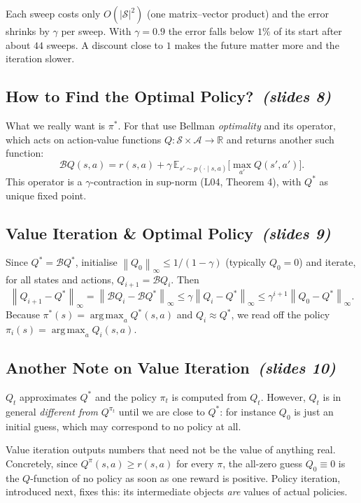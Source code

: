 \documentclass[11pt,a4paper]{article}
\newcommand{\E}{\mathbb{E}}
\newcommand{\R}{\mathbb{R}}
\newcommand{\Sset}{\mathcal{S}}
\newcommand{\Aset}{\mathcal{A}}
\newcommand{\B}{\mathcal{B}}
\newcommand{\norm}[1]{\left\lVert #1\right\rVert_\infty}
\DeclareMathOperator*{\argmax}{arg\,max}
\newcommand{\sltag}[1]{\texorpdfstring{\ \emph{(slides #1)}}{ (slides #1)}}
\theoremstyle{plain}
\theoremstyle{definition}
\theoremstyle{remark}
\begin{document}
\begin{intuition}
Each sweep costs only $O(|\Sset|^2)$ (one matrix--vector product) and the error shrinks by $\gamma$ per sweep. With $\gamma=0.9$ the error falls below $1\%$ of its start after about $44$ sweeps. A discount close to $1$ makes the future matter more and the iteration slower.
\end{intuition}

\subsection{How to Find the Optimal Policy?\sltag{8}}
What we really want is $\pi^*$. For that use Bellman \emph{optimality} and its operator, which acts on action-value functions $Q:\Sset\times\Aset\to\R$ and returns another such function:
\[
\B Q(s,a)=r(s,a)+\gamma\,\E_{s'\sim p(\cdot\mid s,a)}\Big[\max_{a'}Q(s',a')\Big].
\]
This operator is a $\gamma$-contraction in sup-norm (L04, Theorem 4), with $Q^*$ as unique fixed point.

\subsection{Value Iteration \& Optimal Policy\sltag{9}}
Since $Q^*=\B Q^*$, initialise $\norm{Q_0}\le1/(1-\gamma)$ (typically $Q_0=0$) and iterate, for all states and actions, $Q_{i+1}=\B Q_i$. Then
\[
\norm{Q_{i+1}-Q^*}=\norm{\B Q_i-\B Q^*}\le\gamma\norm{Q_i-Q^*}\le\gamma^{i+1}\norm{Q_0-Q^*}.
\]
Because $\pi^*(s)=\argmax_aQ^*(s,a)$ and $Q_i\approx Q^*$, we read off the policy $\pi_i(s)=\argmax_aQ_i(s,a)$.

\subsection{Another Note on Value Iteration\sltag{10}}
$Q_t$ approximates $Q^*$ and the policy $\pi_t$ is computed from $Q_t$. However, $Q_t$ is in general \emph{different from} $Q^{\pi_t}$ until we are close to $Q^*$: for instance $Q_0$ is just an initial guess, which may correspond to no policy at all.

\begin{intuition}
Value iteration outputs numbers that need not be the value of anything real. Concretely, since $Q^\pi(s,a)\ge r(s,a)$ for every $\pi$, the all-zero guess $Q_0\equiv0$ is the $Q$-function of no policy as soon as one reward is positive. Policy iteration, introduced next, fixes this: its intermediate objects \emph{are} values of actual policies.
\end{intuition}
\end{document}
